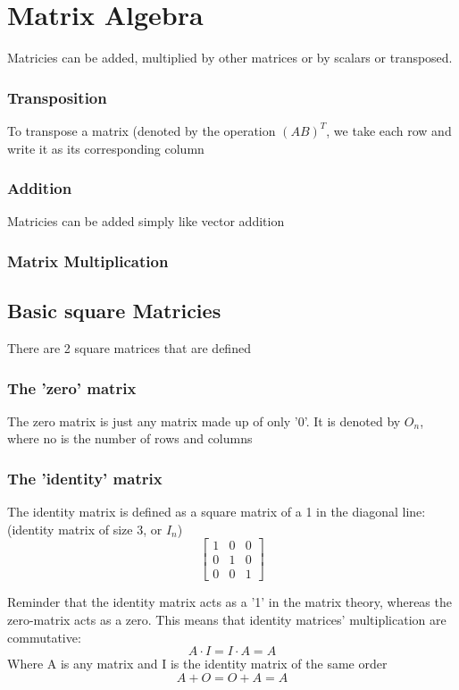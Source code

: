 \documentclass[11pt]{book}
\begin{document}
{{\chapter{Matrix Algebra}
\par{Matricies can be added, multiplied by other matrices or by scalars or transposed. }
\subsection{Transposition}
\par{To transpose a matrix (denoted by the operation $\left(AB\right)^{T}$, we take each row and write it as its corresponding column}
\subsection{Addition}
\par{Matricies can be added simply like vector addition}
\subsection{Matrix Multiplication}
\section{Basic square Matricies}
\par{There are 2 square matrices that are defined}
\subsection{The 'zero' matrix}
\par{The zero matrix is just any matrix made up of only '0'. It is denoted by $O_{n}$, where no is the number of rows and columns}
\subsection{The 'identity' matrix}
\par{The identity matrix is defined as a square matrix of a 1 in the diagonal line: (identity matrix of size 3, or $I_{n}$)}
\[
	\left[
		\begin{matrix}
			1 & 0 & 0 \\
			0 & 1 & 0 \\
			0 & 0 & 1 
		\end{matrix}
	\right]
\] 
\par{Reminder that the identity matrix acts as a '1' in the matrix theory, whereas the zero-matrix acts as a zero. This means that identity matrices' multiplication are commutative: }
\[
A\cdot I=I\cdot A=A
\] Where A is any matrix and I is the identity matrix of the same order \[
A+O=O+A=A
\] 
}}
\end{document}

